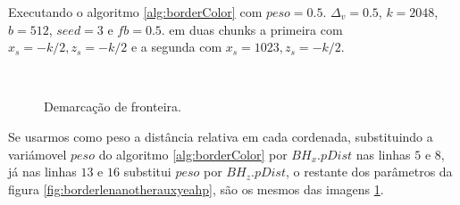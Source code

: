 Executando o algoritmo \ref{alg:borderColor} com $peso = 0.5$. $\Delta_{v} = 0.5$, 
$k = 2048$, $b = 512$, $seed = 3$ e $fb = 0.5$. em duas chunks a primeira com $ x_{s} = -k/2 , z_{s} = -k/2$
e a segunda com $ x_{s} = 1023 , z_{s} = -k/2$.

\begin{figure}[H]
     \centering
     \hspace{0.1cm}
     \\
     \caption{Demarcação de fronteira.}
     
     \label{fig:borderlenanotherauxyeah}
\end{figure}

Se usarmos como peso a distância relativa em cada cordenada, substituindo a variámovel
$peso$ do algoritmo \ref{alg:borderColor} por $BH_{x}.pDist$ nas linhas $5$ e $8$, já
nas linhas $13$ e $16$ substitui $peso$ por $BH_{z}.pDist$, o restante dos parâmetros
da figura \ref{fig:borderlenanotherauxyeahp}, são os mesmos das imagens \ref{fig:borderlenanotherauxyeah}.

